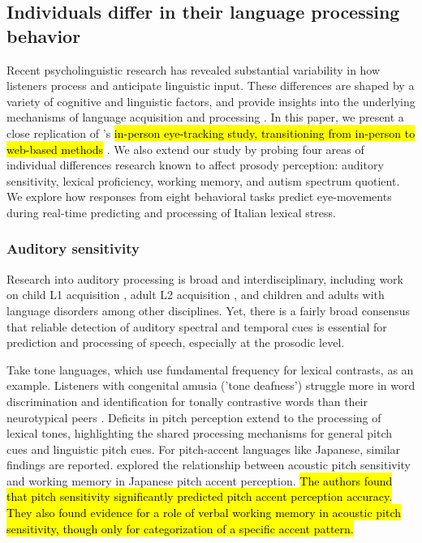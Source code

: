 \subsection{Individuals differ in their language processing behavior}

Recent psycholinguistic research has revealed substantial variability in how listeners process and anticipate linguistic input. These differences are shaped by a variety of cognitive and linguistic factors, and provide insights into the underlying mechanisms of language acquisition and processing \citep{Huettig2016, Li2023, Kidd2018}. In this paper, we present a close replication of \cite{Sulpizio_McQueen_2012}'s \hl{in-person eye-tracking study, transitioning from in-person to web-based methods} \citep{mcmanus2022replication}. We also extend our study by probing four areas of individual differences research known to affect prosody perception: auditory sensitivity, lexical proficiency, working memory, and autism spectrum quotient. We explore how responses from eight behavioral tasks predict eye-movements during real-time predicting and processing of Italian lexical stress.

\subsubsection{Auditory sensitivity}
Research into auditory processing is broad and interdisciplinary, including work on child L1 acquisition \citep{benasich2002infant}, adult L2 acquisition \citep{lengeris2010effect, kempe2012individual}, and children and adults with language disorders \citep{Liu2018, goswami2013impaired} among other disciplines. Yet, there is a fairly broad consensus that reliable detection of auditory spectral and temporal cues is essential for prediction and processing of speech, especially at the prosodic level. 

Take tone languages, which use fundamental frequency for lexical contrasts, as an example. Listeners with congenital amusia ('tone deafness') struggle more in word discrimination and identification for tonally contrastive words than their neurotypical peers \citep{nan_2010, zhu2023tone}. Deficits in pitch perception extend to the processing of lexical tones, highlighting the shared processing mechanisms for general pitch cues and linguistic pitch cues. For pitch-accent languages like Japanese, similar findings are reported. \cite{goss_2014} explored the relationship between acoustic pitch sensitivity and working memory in Japanese pitch accent perception. \hl{The authors found that pitch sensitivity significantly predicted pitch accent perception accuracy. They also found evidence for a role of verbal working memory in acoustic pitch sensitivity, though only for categorization of a specific accent pattern.}

